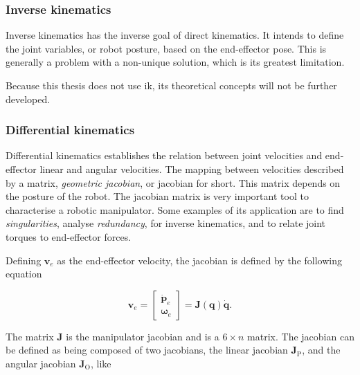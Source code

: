 
\subsubsection{Inverse kinematics}
\label{subsubsec:inverse_kinematics}

Inverse kinematics has the inverse goal of direct kinematics. It intends to define the joint variables, or robot posture, based on the end-effector pose. This is generally a problem with a non-unique solution, which is its greatest limitation.

Because this thesis does not use \gls{ik}, its theoretical concepts will not be further developed.


\subsubsection{Differential kinematics}
\label{subsubsec:differential_kinematics}

Differential kinematics establishes the relation between joint velocities and end-effector linear and angular velocities. The mapping between velocities described by a matrix, \emph{geometric jacobian}, or jacobian for short. This matrix depends on the posture of the robot. The jacobian matrix is very important tool to characterise a robotic manipulator. Some examples of its application are to find \emph{singularities}, analyse \emph{redundancy}, for inverse kinematics, and to relate joint torques to end-effector forces.

Defining $\boldsymbol{v}_e$ as the end-effector velocity, the jacobian is defined by the following equation

\begin{equation}
    \boldsymbol{v}_e = \begin{bmatrix}
    \dot{\boldsymbol{p}}_e\\
    \boldsymbol{\omega}_e
    \end{bmatrix} = \boldsymbol{J}(\boldsymbol{q})\dot{\boldsymbol{q}}.
\end{equation}

The matrix $\boldsymbol{J}$ is the manipulator jacobian and is a $6 \times n$ matrix. The jacobian can be defined as being composed of two jacobians, the linear jacobian $\boldsymbol{J}_\text{P}$, and the angular jacobian $\boldsymbol{J}_\text{O}$, like


